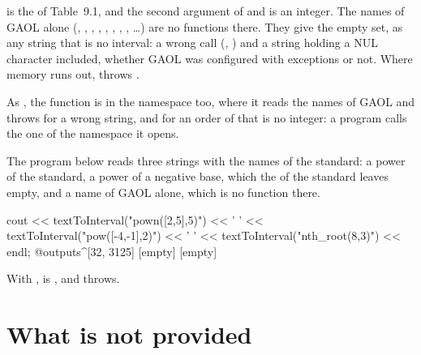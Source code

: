 \noindent
{} is the  of Table~9.1, and the second argument of
 and  is an integer. The names of GAOL alone
(, , , ,
, , ,
, \ldots) are no functions there.
They give the empty set, as any string that is no interval: a wrong call
(, ) and a string holding a NUL
character included, whether GAOL was configured with exceptions or
not.\newinvfive{} Where memory runs out,  throws
.

\medskip
As , the function  is in the namespace
 too, where it reads the names of GAOL and throws
 for a wrong string, and 
for an order of  that is no integer: a program calls the one of
the namespace it opens.

\begin{Ex}\label{ex:ieee1788-text}
The program below reads three strings with the names of the standard: a
power of the standard, a power of a negative base, which the  of
the standard leaves empty, and a name of GAOL alone, which is no function
there.
\begin{example}
cout << textToInterval("pown([2,5],5)") << ' '
     << textToInterval("pow([-4,-1],2)") << ' '
     << textToInterval("nth_root(8,3)") << endl;
@outputs^[32, 3125] [empty] [empty]~
\end{example}
With , 
is , and  throws.
\end{Ex}

\section{What is not provided}\label{sec:ieee1788-missing}
%

